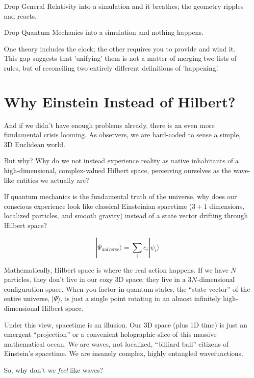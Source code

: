 Drop General Relativity into a simulation and it breathes; the geometry ripples and reacts.

Drop Quantum Mechanics into a simulation and nothing happens.

One theory includes the clock; the other requires you to provide and wind it. This gap suggests that 'unifying' them is not a matter of merging two lists of rules,
but of reconciling two entirely different definitions of 'happening'.



\section{Why Einstein Instead of Hilbert?}

And if we didn't have enough problems already, there is an even more fundamental crisis looming.
As observers, we are hard-coded to sense a simple, 3D Euclidean world. 

But why? Why do we not instead experience reality as native inhabitants of a high-dimensional, complex-valued Hilbert space, perceiving ourselves as the wave-like entities we actually are? 

If quantum mechanics is the fundamental truth of the universe, why does our conscious experience look like classical Einsteinian spacetime ($3+1$ dimensions, localized particles, and smooth gravity) instead of a state vector drifting through Hilbert space?

\begin{equation*}
|\Psi_{\text{universe}}\rangle = \sum_{i} c_i | \psi_i \rangle
\end{equation*}

Mathematically, Hilbert space is where the real action happens.
If we have $N$ particles, they don't live in our cozy 3D space; they live in a $3N$-dimensional configuration space.
When you factor in quantum states, the ``state vector'' of the entire universe, $|\Psi\rangle$, is just a single point rotating in an almost infinitely high-dimensional Hilbert space.

Under this view, spacetime is an illusion.
Our 3D space (plus 1D time) is just an emergent ``projection'' or a convenient holographic slice of this massive mathematical ocean.
We are waves, not localized, ``billiard ball'' citizens of Einstein's spacetime. We are insanely complex, highly entangled wavefunctions. 

So, why don't we \textit{feel} like waves?

